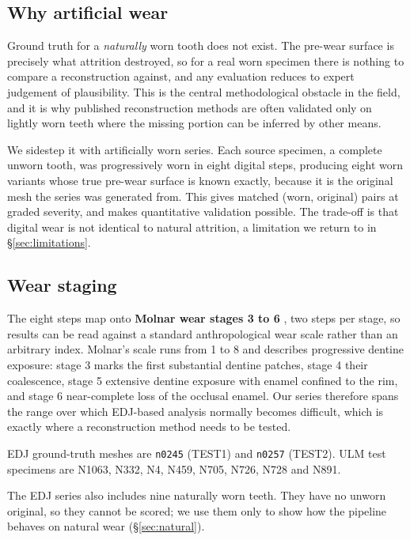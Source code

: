 \documentclass[10pt,a4paper,twocolumn]{article}
\newcommand{\code}[1]{\texttt{#1}}
\begin{document}
\subsection{Why artificial wear}

Ground truth for a \emph{naturally} worn tooth does not exist. The pre-wear
surface is precisely what attrition destroyed, so for a real worn specimen there
is nothing to compare a reconstruction against, and any evaluation reduces to
expert judgement of plausibility. This is the central methodological obstacle in
the field, and it is why published reconstruction methods are often validated
only on lightly worn teeth where the missing portion can be inferred by other
means.

We sidestep it with artificially worn series. Each source specimen, a complete
unworn tooth, was progressively worn in eight digital steps, producing eight
worn variants whose true pre-wear surface is known exactly, because it is the
original mesh the series was generated from. This gives matched (worn, original)
pairs at graded severity, and makes quantitative validation possible. The
trade-off is that digital wear is not identical to natural attrition, a
limitation we return to in \S\ref{sec:limitations}.

\subsection{Wear staging}

The eight steps map onto \textbf{Molnar wear stages 3 to 6}
\citep{molnar1971wear}, two steps per stage, so results can be read against a
standard anthropological wear scale rather than an arbitrary index. Molnar's
scale runs from 1 to 8 and describes progressive dentine exposure: stage 3 marks the
first substantial dentine patches, stage 4 their coalescence, stage 5 extensive
dentine exposure with enamel confined to the rim, and stage 6 near-complete loss
of the occlusal enamel. Our series therefore spans the range over which EDJ-based
analysis normally becomes difficult, which is exactly where a reconstruction
method needs to be tested.

EDJ ground-truth meshes are \code{n0245} (TEST1) and \code{n0257} (TEST2). ULM
test specimens are N1063, N332, N4, N459, N705, N726, N728 and N891.

The EDJ series also includes nine naturally worn teeth. They have no unworn
original, so they cannot be scored; we use them only to show how the pipeline
behaves on natural wear (\S\ref{sec:natural}).
\end{document}
